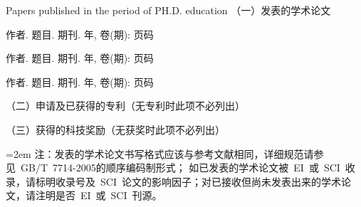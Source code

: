 {} {Papers
published in the period of PH.D. education}
\setlength{\parindent}{0em}
（一）发表的学术论文
\begin{publist}
\item 作者. 题目. 期刊. 年, 卷(期): 页码

\item 作者. 题目. 期刊. 年, 卷(期): 页码

\item 作者. 题目. 期刊. 年, 卷(期): 页码
\end{publist}

（二）申请及已获得的专利（无专利时此项不必列出）


（三）获得的科技奖励（无获奖时此项不必列出）

\vfill
{}\hangindent=2em\noindent
注：发表的学术论文书写格式应该与参考文献相同，详细规范请参见~GB/T~7714-2005的顺序编码制形式；
如已发表的学术论文被~EI~或~SCI~收录，请标明收录号及~SCI~论文的影响因子；对已接收但尚未发表出来的学术论文，请注明是否~EI~或~SCI~刊源。


\setlength{\parindent}{2em}
